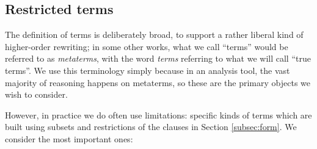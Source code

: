 \documentclass{lmcs}
\theoremstyle{theorem}\newtheorem{theorem}{Theorem}
\theoremstyle{theorem}\newtheorem{lemma}[theorem]{Lemma}
\theoremstyle{theorem}\newtheorem{corollary}[theorem]{Corollary}
\theoremstyle{definition}\newtheorem{definition}[theorem]{Definition}
\theoremstyle{definition}\newtheorem{example}[theorem]{Example}
\begin{document}
\subsection{Restricted terms}\label{subsec:termsets}

The definition of terms is deliberately broad, to support a rather liberal kind
of higher-order rewriting; in some other works, what we call ``terms'' would be
referred to as \emph{metaterms}, with the word \emph{terms} referring to what we
will call ``true terms''.  We use this terminology simply because in an analysis
tool, the vast majority of reasoning happens on metaterms, so these are the
primary objects we wish to consider.

However, in practice we do often use limitations: specific kinds of terms
which are built using subsets and restrictions of the clauses in Section
\ref{subsec:form}.  We consider the most important ones:
\end{document}
